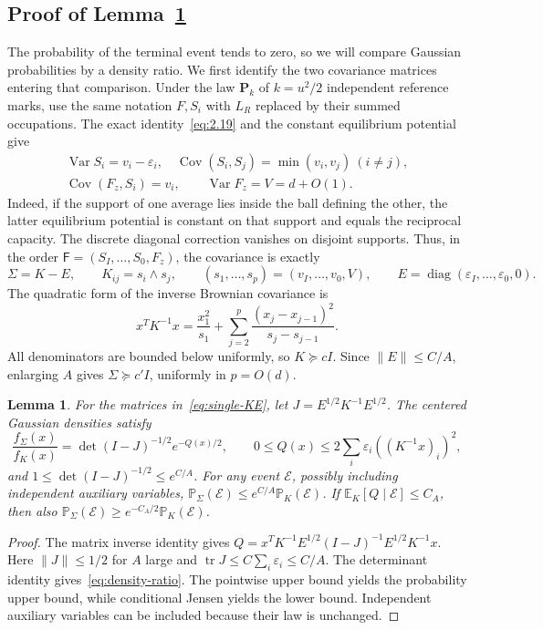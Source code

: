 \documentclass[11pt,letterpaper,reqno]{amsart}
\numberwithin{equation}{section}
\newtheorem{lemma}[theorem]{Lemma}
\theoremstyle{remark}
\DeclareMathOperator{\Var}{Var}
\DeclareMathOperator{\Cov}{Cov}
\DeclareMathOperator{\diag}{diag}
\begin{document}
\subsection{Proof of Lemma~\ref{lem:gaussian-density}}\label{sec:covariance}
The probability of the terminal event tends to zero, so we will compare Gaussian probabilities by a density ratio. We first identify the two covariance matrices entering that comparison.
Under the law $\mathbf P_k$ of $k=u^2/2$ independent reference marks, use
the same notation $F,S_i$ with $L_R$ replaced by their summed occupations.
The exact identity~\eqref{eq:2.19} and the constant equilibrium potential give
\begin{equation}\label{eq:single-covariance}
\begin{gathered}
\Var S_i=v_i-\varepsilon_i,\quad
\Cov(S_i,S_j)=\min(v_i,v_j)\ (i\ne j),\\
\Cov(F_z,S_i)=v_i,\qquad \Var F_z=V=d+O(1).
\end{gathered}
\end{equation}
Indeed, if the support of one average lies inside the ball defining the other, the latter equilibrium potential is constant on that support and equals the reciprocal capacity. The discrete diagonal correction vanishes on disjoint supports. Thus, in the order
$\mathsf F=(S_I,\ldots,S_0,F_z)$, the covariance is exactly
\begin{equation}\label{eq:single-KE}
\Sigma=K-E,\qquad K_{ij}=s_i\wedge s_j,\qquad
(s_1,\ldots,s_p)=(v_I,\ldots,v_0,V),\qquad
E=\diag(\varepsilon_I,\ldots,\varepsilon_0,0).
\end{equation}
The quadratic form of the inverse Brownian covariance is
\[
x^TK^{-1}x=\frac{x_1^2}{s_1}
+\sum_{j=2}^p\frac{(x_j-x_{j-1})^2}{s_j-s_{j-1}}.
\]
All denominators are bounded below uniformly, so $K\succeq cI$. Since
$\|E\|\le C/A$, enlarging $A$ gives $\Sigma\succeq c'I$, uniformly in $p=O(d)$.

\begin{lemma}\label{lem:gaussian-density}
For the matrices in~\eqref{eq:single-KE}, let
$J=E^{1/2}K^{-1}E^{1/2}$. The centered Gaussian densities satisfy
\begin{equation}\label{eq:density-ratio}
\frac{f_\Sigma(x)}{f_K(x)}=\det(I-J)^{-1/2}e^{-Q(x)/2},\qquad
0\le Q(x)\le2\sum_i\varepsilon_i((K^{-1}x)_i)^2,
\end{equation}
and $1\le\det(I-J)^{-1/2}\le e^{C/A}$.
For any event $\mathcal E$, possibly including independent auxiliary variables,
$\mathbb P_\Sigma(\mathcal E)\le e^{C/A}\mathbb P_K(\mathcal E)$.
If $\mathbb E_K[Q\mid\mathcal E]\le C_A$, then also
$\mathbb P_\Sigma(\mathcal E)\ge e^{-C_A/2}\mathbb P_K(\mathcal E)$.
\end{lemma}
\begin{proof}
The matrix inverse identity gives
$Q=x^TK^{-1}E^{1/2}(I-J)^{-1}E^{1/2}K^{-1}x$.
Here $\|J\|\le1/2$ for $A$ large and
$\operatorname{tr}J\le C\sum_i\varepsilon_i\le C/A$.
The determinant identity gives~\eqref{eq:density-ratio}. The pointwise upper bound yields the probability upper bound, while conditional Jensen yields the lower bound. Independent auxiliary variables can be included because their law is unchanged.
\end{proof}
\end{document}

